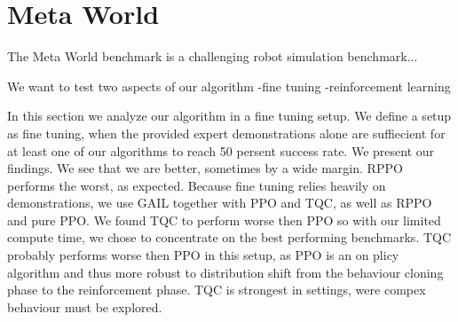 \section{Meta World}
The Meta World benchmark is a challenging robot simulation benchmark...

We want to test two aspects of our algorithm
-fine tuning
-reinforcement learning

In this section we analyze our algorithm in a fine tuning setup. We define a setup as fine tuning, when the provided expert demonstrations alone 
are suffiecient for at least one of our algorithms to reach 50 persent success rate. We present our findings. We see that we are better, sometimes by a 
wide margin. RPPO performs the worst, as expected. Because fine tuning relies heavily on demonstrations, we use GAIL together with PPO and TQC, as well as 
RPPO and pure PPO. We found TQC to perform worse then PPO so with our limited compute time, we chose to concentrate on the best performing benchmarks.
TQC probably performs worse then PPO in this setup, as PPO is an on plicy algorithm and thus more robust to distribution shift from the 
behaviour cloning phase to the reinforcement phase. TQC is strongest in settings, were compex behaviour must be explored.

